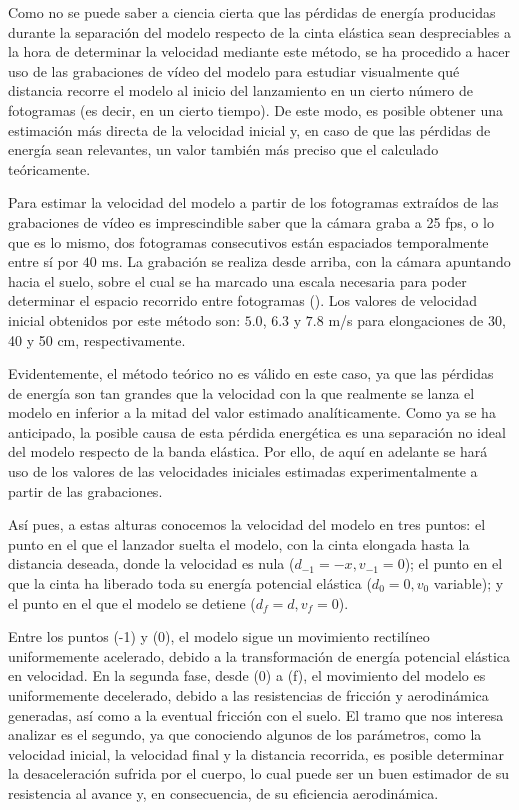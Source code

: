 Como no se puede saber a ciencia cierta que las pérdidas de energía producidas durante la separación del modelo respecto de la cinta elástica sean despreciables a la hora de determinar la velocidad mediante este método, se ha procedido a hacer uso de las grabaciones de vídeo del modelo para estudiar visualmente qué distancia recorre el modelo al inicio del lanzamiento en un cierto número de fotogramas (es decir, en un cierto tiempo). De este modo, es posible obtener una estimación más directa de la velocidad inicial y, en caso de que las pérdidas de energía sean relevantes, un valor también más preciso que el calculado teóricamente.

Para estimar la velocidad del modelo a partir de los fotogramas extraídos de las grabaciones de vídeo es imprescindible saber que la cámara graba a 25 fps, o lo que es lo mismo, dos fotogramas consecutivos están espaciados temporalmente entre sí por $40$ ms. La grabación se realiza desde arriba, con la cámara apuntando hacia el suelo, sobre el cual se ha marcado una escala necesaria para poder determinar el espacio recorrido entre fotogramas (). Los valores de velocidad inicial obtenidos por este método son: $5.0$, $6.3$ y $7.8$ m/s para elongaciones de 30, 40 y 50 cm, respectivamente.


Evidentemente, el método teórico no es válido en este caso, ya que las pérdidas de energía son tan grandes que la velocidad con la que realmente se lanza el modelo en inferior a la mitad del valor estimado analíticamente. Como ya se ha anticipado, la posible causa de esta pérdida energética es una separación no ideal del modelo respecto de la banda elástica. Por ello, de aquí en adelante se hará uso de los valores de las velocidades iniciales estimadas experimentalmente a partir de las grabaciones.

Así pues, a estas alturas conocemos la velocidad del modelo en tres puntos: el punto en el que el lanzador suelta el modelo, con la cinta elongada hasta la distancia deseada, donde la velocidad es nula ($d_{-1}=-x, v_{-1}=0$); el punto en el que la cinta ha liberado toda su energía potencial elástica ($d_0=0, v_0$ variable); y el punto en el que el modelo se detiene ($d_f=d, v_f=0$).

Entre los puntos (-1) y (0), el modelo sigue un movimiento rectilíneo uniformemente acelerado, debido a la transformación de energía potencial elástica en velocidad. En la segunda fase, desde (0) a (f), el movimiento del modelo es uniformemente decelerado, debido a las resistencias de fricción y aerodinámica generadas, así como a la eventual fricción con el suelo. El tramo que nos interesa analizar es el segundo, ya que conociendo algunos de los parámetros, como la velocidad inicial, la velocidad final y la distancia recorrida, es posible determinar la desaceleración sufrida por el cuerpo, lo cual puede ser un buen estimador de su resistencia al avance y, en consecuencia, de su eficiencia aerodinámica.

